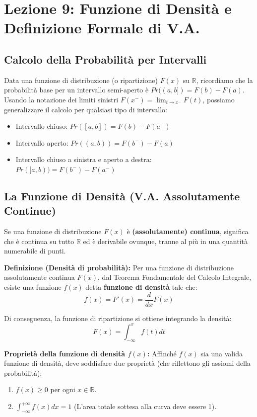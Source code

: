\documentclass[12pt, a4paper]{article}
\begin{document}
\section{Lezione 9: Funzione di Densità e Definizione Formale di V.A.}

\subsection{Calcolo della Probabilità per Intervalli}
Data una funzione di distribuzione (o ripartizione) $F(x)$ su $\mathbb{R}$, ricordiamo che la probabilità base per un intervallo semi-aperto è $Pr((a, b]) = F(b) - F(a)$. 
Usando la notazione dei limiti sinistri $F(x^-) = \lim_{t \to x^-} F(t)$, possiamo generalizzare il calcolo per qualsiasi tipo di intervallo:
\begin{itemize}
    \item Intervallo chiuso: $Pr([a, b]) = F(b) - F(a^-)$
    \item Intervallo aperto: $Pr((a, b)) = F(b^-) - F(a)$
    \item Intervallo chiuso a sinistra e aperto a destra: $Pr([a, b)) = F(b^-) - F(a^-)$
\end{itemize}

\subsection{La Funzione di Densità (V.A. Assolutamente Continue)}
Se una funzione di distribuzione $F(x)$ è \textbf{(assolutamente) continua}, significa che è continua su tutto $\mathbb{R}$ ed è derivabile ovunque, tranne al più in una quantità numerabile di punti.

\textbf{Definizione (Densità di probabilità):} Per una funzione di distribuzione assolutamente continua $F(x)$, dal Teorema Fondamentale del Calcolo Integrale, esiste una funzione $f(x)$ detta \textbf{funzione di densità} tale che:
$$ f(x) = F'(x) = \frac{d}{dx}F(x) $$

Di conseguenza, la funzione di ripartizione si ottiene integrando la densità:
$$ F(x) = \int_{-\infty}^{x} f(t) dt $$

\textbf{Proprietà della funzione di densità $f(x)$:}
Affinché $f(x)$ sia una valida funzione di densità, deve soddisfare due proprietà (che riflettono gli assiomi della probabilità):
\begin{enumerate}
    \item $f(x) \ge 0$ per ogni $x \in \mathbb{R}$.
    \item $\int_{-\infty}^{+\infty} f(x) dx = 1$ (L'area totale sottesa alla curva deve essere 1).
\end{enumerate}
\end{document}
